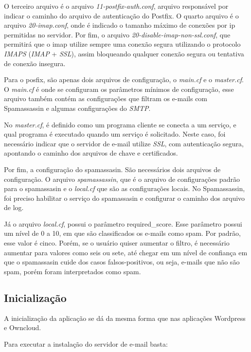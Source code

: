 O terceiro arquivo é o arquivo \textit{11-postfix-auth.conf}, arquivo responsável por 
indicar o caminho do arquivo de autenticação
do Postfix. O quarto arquivo é o arquivo \textit{20-imap.conf}, onde é indicado o tamanho
máximo de conexões por ip permitidas no servidor. Por fim, o arquivo
\textit{20-disable-imap-non-ssl.conf}, que permitirá que o imap utilize sempre uma conexão
segura utilizando o protocolo \textit{IMAPS} (\textit{IMAP} + \textit{SSL}), assim bloqueando 
qualquer conexão segura ou tentativa de conexão insegura.

Para o posfix, são apenas dois arquivos de configuração, o \textit{main.cf} e o 
\textit{master.cf}.
O \textit{main.cf} é onde se configuram os parâmetros mínimos de configuração, esse arquivo
também contém as configurações que filtram os e-mails com Spamassassin e 
algumas configurações do \textit{SMTP}. 

No \textit{master.cf}, é definido como um programa cliente se conecta a um serviço, e qual
programa é executado quando um serviço é solicitado. Neste caso, foi necessário
indicar que o servidor de e-mail utilize \textit{SSL}, com autenticação segura, 
apontando o caminho dos arquivos de chave e certificados.

Por fim, a configuração do spamassasin. São necessários dois arquivos de configuração.
O arquivo \textit{spamassassin}, que é o arquivo de configurações padrão para o spamassasin e o
\textit{local.cf} que são as configurações locais. No Spamassassin, foi preciso habilitar 
o serviço do spamassasin e configurar o caminho dos arquivo de log.

Já o arquivo \textit{local.cf}, possui o parâmetro required\_score. Esse parâmetro 
possui um nível de 0 a 10, em que 
são classificados os e-mails como spam. Por padrão, esse valor é cinco. Porém, se 
o usuário quiser aumentar o filtro, é necessário aumentar para valores como seis ou sete, 
até chegar em um nível de confiança em que o spamassasin cuide dos casos falsos-positivos, 
ou seja, e-mails que não são spam, porém foram interpretados como spam.

\subsection{Inicialização}

A inicialização da aplicação se dá da mesma forma que nas aplicações Wordpress
e Owncloud.

Para executar a instalação do servidor de e-mail basta:

